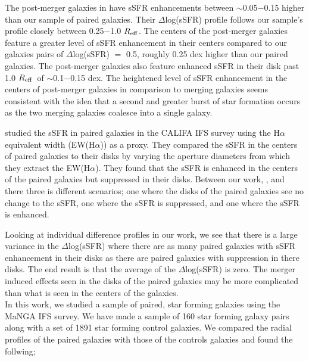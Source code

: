 \documentclass[iop,revtex4,twocolumn,apj,numberedappendix,appendixfloats]{emulateapj}
\newcommand{\reff}{$R_{\rm eff}$}
\newcommand{\ewha}{EW(H$\alpha$)}
\begin{document}
The post-merger galaxies in \citet{Thorp:2019} have sSFR enhancements between $\sim$0.05$-$0.15 higher than our sample of paired galaxies. Their $\Delta$log(sSFR) profile follows our sample's profile closely between 0.25$-$1.0 \reff. The centers of the post-merger galaxies feature a greater level of sSFR enhancement in their centers compared to our galaxies pairs of $\Delta$log(sSFR) $=$ 0.5, roughly 0.25 dex higher than our paired galaxies. The post-merger galaxies also feature enhanced sSFR in their disk past 1.0 \reff\ of $\sim$0.1$-$0.15 dex. The heightened level of sSFR enhancement in the centers of post-merger galaxies in comparison to merging galaxies seems consistent with the idea that a second and greater burst of star formation occurs as the two merging galaxies coalesce into a single galaxy. 

\citet{Barrera-Ballesteros:2015} studied the sSFR in paired galaxies in the CALIFA IFS survey using the H$\alpha$ equivalent width (\ewha) as a proxy. They compared the sSFR in the centers of paired galaxies to their disks by varying the aperture diameters from which they extract the \ewha. They found that the sSFR is enhanced in the centers of the paired galaxies but suppressed in their disks. Between our work, \citet{Barrera-Ballesteros:2015}, and \citet{Pan:2019} there three is different scenarios; one where the disks of the paired galaxies see no change to the sSFR, one where the sSFR is suppressed, and one where the sSFR is enhanced. 

Looking at individual difference profiles in our work, we see that there is a large variance in the $\Delta$log(sSFR) where there are as many paired galaxies with sSFR enhancement in their disks as there are paired galaxies with suppression in there disks. The end result is that the average of the $\Delta$log(sSFR) is zero. The merger induced effects seen in the disks of the paired galaxies may be more complicated than what is seen in the centers of the galaxies. \\



In this work, we studied a sample of paired, star forming galaxies using the MaNGA IFS survey. We have made a sample of 160 star forming galaxy pairs along with a set of 1891 star forming control galaxies. We compared the radial profiles of the paired galaxies with those of the controls galaxies and found the follwing;
\end{document}

